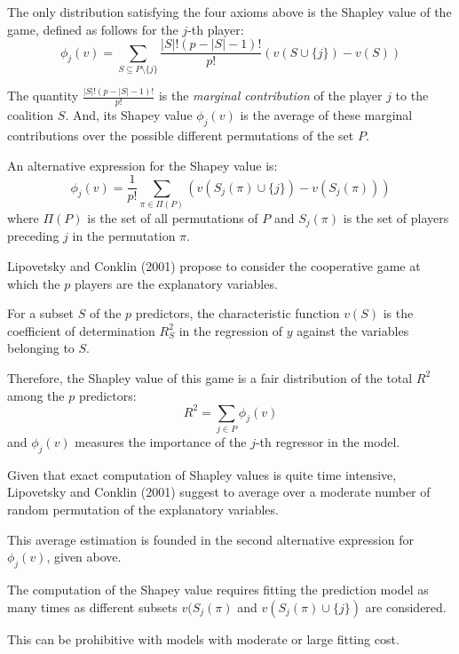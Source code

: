 \begin{theorem}{}{}
	The only distribution satisfying the four axioms above is the Shapley value of the game,
	defined as follows for the $j$-th player:
	\begin{equation*}
		\phi_j(v) = \sum_{S \subseteq P \setminus \{j\}} \frac{|S|! (p - |S| - 1)!}{p!} (v(S \cup \{j\}) - v(S))
	\end{equation*}

	\tcblower

	The quantity $\frac{|S|! (p - |S| - 1)!}{p!}$ is the \emph{marginal contribution} of
	the player $j$ to the coalition $S$. And, its Shapey value $\phi_j(v)$ is the
	average of these marginal contributions over the possible different permutations
	of the set $P$.

	An alternative expression for the Shapey value is: %
	\begin{equation*}
		\phi_j(v) = \frac{1}{p!} \sum_{\pi \in \Pi(P)}
		\left(
		v(S_j(\pi) \cup \{j\}) - v(S_j(\pi))
		\right)
	\end{equation*}
	where $\Pi(P)$ is the set of all permutations of $P$ and $S_j(\pi)$ is the
	set of players preceding $j$ in the permutation $\pi$.
\end{theorem}

Lipovetsky and Conklin (2001) propose to consider the cooperative game at which
the $p$ players are the explanatory variables.

For a subset $S$ of the $p$ predictors, the characteristic function $v(S)$ is
the coefficient of determination $R^2_S$ in the regression of $y$ against the
variables belonging to $S$.

Therefore, the Shapley value of this game is a fair distribution of the total
$R^2$ among the $p$ predictors:
\begin{equation*}
	R^2 = \sum_{j \in P} \phi_j(v)
\end{equation*}
and $\phi_j(v)$ measures the importance of the $j$-th regressor in the model.

Given that exact computation of Shapley values is quite time intensive,
Lipovetsky and Conklin (2001) suggest to average over
a moderate number of random permutation of the explanatory
variables. %

This average estimation is founded in  the second alternative expression
for $\phi_j(v)$, given above.

\begin{note}
	The computation of the Shapey value requires fitting the prediction model as many times as
	different subsets $v(S_j(\pi)$ and $v(S_j(\pi) \cup \{j\})$ are considered.

	This can be prohibitive with models with moderate or large fitting cost.
\end{note}

